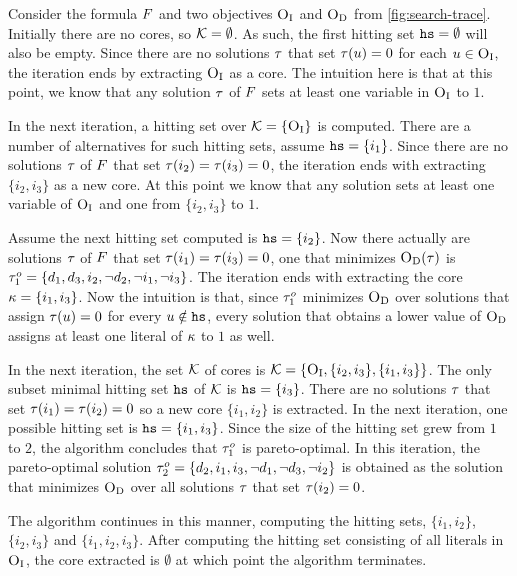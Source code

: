 \begin{example}
  Consider the formula $F$ and two objectives $\textsc{O}_{\text{I}}$ and $\textsc{O}_{\text{D}}$ from \cref{fig:search-trace}. 
  Initially there are no cores, so $\mathcal{K} = \emptyset$.
  As such, the first hitting set $\texttt{hs} = \emptyset$ will also be empty.
  Since there are no solutions $\tau$ that set $\tau(u) = 0$ for each $u \in \textsc{O}_{\text{I}}$, the iteration ends by extracting $\textsc{O}_{\text{I}}$ as a core. 
  The intuition here is that at this point, we know that any solution $\tau$ of $F$ sets at least one variable in $\textsc{O}_{\text{I}}$ to $1$.

  In the next iteration, a hitting set over $\mathcal{K} = \{ \textsc{O}_{\text{I}} \}$ is computed. There are a number of alternatives for such hitting sets, assume $\texttt{hs} = \{ i_1 \}$.
  Since there are no solutions $\tau$ of $F$ that set $\tau(i_2) = \tau(i_3) = 0$, the iteration ends with extracting $\{ i_2, i_3\}$ as a new core.
  At this point we know that any solution sets at least one variable of $\textsc{O}_{\text{I}}$ and one from $\{i_2, i_3\}$ to $1$.

  Assume the next hitting set computed is $\texttt{hs} = \{i_2\}$.
  Now there actually are solutions $\tau$ of $F$ that set $\tau(i_1) = \tau(i_3) = 0$, one that minimizes 
  $\textsc{O}_{\text{D}}(\tau)$ is $\tau^o_1 = \{d_1, d_3, i_2, \lnot d_2, \lnot i_1, \lnot i_3 \}$.
  The iteration ends with extracting the core $\kappa = \{i_1, i_3\}$.
  Now the intuition is that, since $\tau^o_1$ minimizes $\textsc{O}_{\text{D}}$ over solutions that assign $\tau(u) = 0$ for every $u \notin \texttt{hs}$, every solution that obtains a lower value of $\textsc{O}_{\text{D}}$
  assigns at least one literal of $\kappa$ to $1$ as well. 

  In the next iteration, the set $\mathcal{K}$ of cores is $\mathcal{K} = \{ \textsc{O}_{\text{I}}, \{i_2, i_3\}, \{i_1, i_3\}\}$. The only subset minimal hitting set $\texttt{hs}$ of $\mathcal{K}$ is $\texttt{hs} = \{i_3\}$.
  There are no solutions $\tau$ that set $\tau(i_1) = \tau(i_2) = 0$ so a new core $\{i_1, i_2\}$ is extracted. 
  In the next iteration, one possible hitting set is $\texttt{hs} = \{i_1, i_3\}$.
  Since the size of the hitting set grew from $1$ to $2$, the algorithm concludes that $\tau^o_1$ is pareto-optimal. 
  In this iteration, the pareto-optimal solution $\tau^o_2 = \{d_2, i_1, i_3, \lnot d_1, \lnot d_3, \lnot i_2 \}$ is obtained 
  as the solution that minimizes $\textsc{O}_{\text{D}}$ over all solutions $\tau$ that set $\tau(i_2) = 0$.  

  The algorithm continues in this manner, computing the hitting sets, $\{i_1, i_2\}$, $\{i_2, i_3\}$ and $\{i_1, i_2, i_3\}$. 
  After computing the hitting set consisting of all literals in $\textsc{O}_{\text{I}}$, the core extracted is $\emptyset$ at which point the algorithm terminates. 
\end{example}

